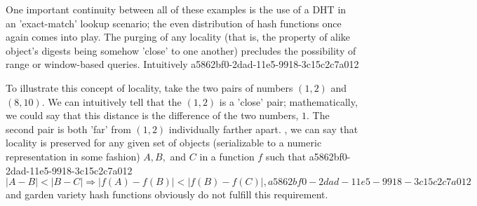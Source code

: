 \documentclass[12pt]{article}
\begin{document}
\par One important continuity between all of these examples is the use of a DHT in an 'exact-match' lookup scenario; the even distribution of hash functions once again comes into play. The purging of any locality (that is, the property of alike object's digests being somehow 'close' to one another) precludes the possibility of range or window-based queries. Intuitively
a5862bf0-2dad-11e5-9918-3c15c2c7a012
\par To illustrate this concept of locality, take the two pairs of numbers $(1,2)$ and $(8,10)$. We can intuitively tell that the $(1,2)$ is a 'close' pair; mathematically, we could say that this distance is the difference of the two numbers, $1$. The second pair is both 'far' from $(1,2)$ individually farther apart. , we can say that locality is preserved for any given set of objects (serializable to a numeric representation in some fashion) $A,B,$ and $C$ in a function $f$ such that
a5862bf0-2dad-11e5-9918-3c15c2c7a012\begin{equation}
|A-B| < |B-C| \Rightarrow |f(A)-f(B)| < |f(B) - f(C)|,
a5862bf0-2dad-11e5-9918-3c15c2c7a012\end{equation}
and garden variety hash functions obviously do not fulfill this requirement.

\printbibliography
\end{document}
